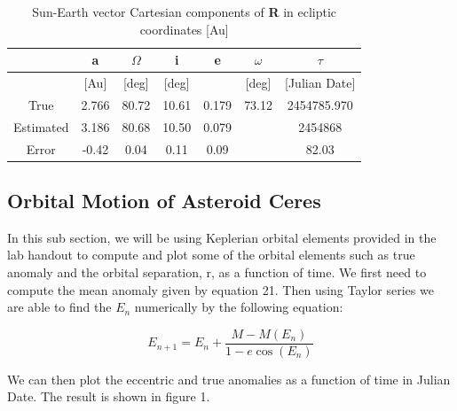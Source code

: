\documentclass[letterpaper,12pt]{article}
\begin{document}
\FloatBarrier
\begin{table}[h!]
\caption{Sun-Earth vector Cartesian components of {\bf R} in ecliptic coordinates [Au]} %
\centering %
\begin{tabular}{| c | c | c | c | c | c | c |} %
\hline\hline %
 & a & \begin{math} \Omega \end{math}  & i & e & \begin{math} \omega \end{math}  & \begin{math} \tau \end{math} \\ [0.5ex] %
\hline %
  & [Au]  &  [deg] &[deg] & & [deg] & [Julian Date] \\ \hline 
True & 2.766 &  80.72 &   10.61 & 0.179 & 73.12 &2454785.970\\ \hline
Estimated &3.186 &  80.68 & 10.50 &  0.079 & & 2454868\\  \hline
Error & -0.42 &  0.04 &    0.11 &   0.09 & & 82.03\\[1ex] %
\hline %
\end{tabular}
\label{table:nonlin} %
\end{table}
\FloatBarrier

\subsection{Orbital Motion of Asteroid Ceres}
In this sub section, we will be using Keplerian orbital elements provided in the lab handout to compute and plot some of the orbital elements such as true anomaly and the orbital separation, r, as a function of time. 
We first need to compute the mean anomaly given by equation 21. Then using Taylor series we are able to find the \begin{math} E_{n} \end{math} numerically by the following equation:

\begin{equation}
E_{n+1}=E_{n}+\frac{M-M(E_{n})}{1-e\cos(E_{n})}
\end{equation}


We can then plot the eccentric and true anomalies as a function of time in Julian Date. The result is shown in figure 1.
\end{document}
